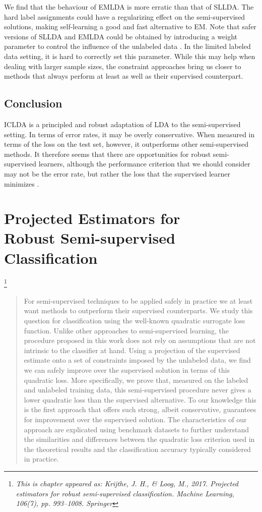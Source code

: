 \documentclass[twoside]{memoir}\usepackage[]{graphicx}\usepackage{xcolor}
\renewcommand{\cite}{\citep}
\newcommand\blfootnote[1]{%
  \begingroup
  \renewcommand\thefootnote{}\footnote{\itshape#1}%
  \addtocounter{footnote}{-1}%
  \endgroup
}
\begin{document}
We find that the behaviour of EMLDA is more erratic than that of SLLDA. The hard label assignments could have a regularizing effect on the semi-supervised solutions, making self-learning a good and fast alternative to EM. Note that safer versions of SLLDA and EMLDA could be obtained by introducing a weight parameter to control the influence of the unlabeled data \cite{McLachlan1975}. In the limited labeled data setting, it is hard to correctly set this parameter. While this may help when dealing with larger sample sizes, the constraint approaches bring us closer to methods that always perform at least as well as their supervised counterpart. 

\section{Conclusion}
ICLDA is a principled and robust adaptation of LDA to the semi-supervised setting. In terms of error rates, it may be overly conservative. When measured in terms of the loss on the test set, however, it outperforms other semi-supervised methods. It therefore seems that there are opportunities for robust semi-supervised learners, although the performance criterion that we should consider may not be the error rate, but rather the loss that the supervised learner minimizes \cite{Loog2014b}.

  
  \chapter[Projected Estimators for Robust Semi-supervised Classification]{Projected Estimators for\\Robust Semi-supervised Classification}
\label{chapter:projection}
\blfootnote{This is chapter appeared as: Krijthe, J. H., \& Loog, M., 2017. Projected estimators for robust semi-supervised classification. Machine Learning, 106(7), pp. 993–1008. Springer}


\begin{abstract}
For semi-supervised techniques to be applied safely in practice we at least want methods to outperform their supervised counterparts. We study this question for classification using the well-known quadratic surrogate loss function. Unlike other approaches to semi-supervised learning, the procedure proposed in this work does not rely on assumptions that are not intrinsic to the classifier at hand. Using a projection of the supervised estimate onto a set of constraints imposed by the unlabeled data, we find we can safely improve over the supervised solution in terms of this quadratic loss. More specifically, we prove that, measured on the labeled and unlabeled training data, this semi-supervised procedure never gives a lower quadratic loss than the supervised alternative. To our knowledge this is the first approach that offers such strong, albeit conservative, guarantees for improvement over the supervised solution. The characteristics of our approach are explicated using benchmark datasets to further understand the similarities and differences between the quadratic loss criterion used in the theoretical results and the classification accuracy typically considered in practice.
\end{abstract}
\end{document}
